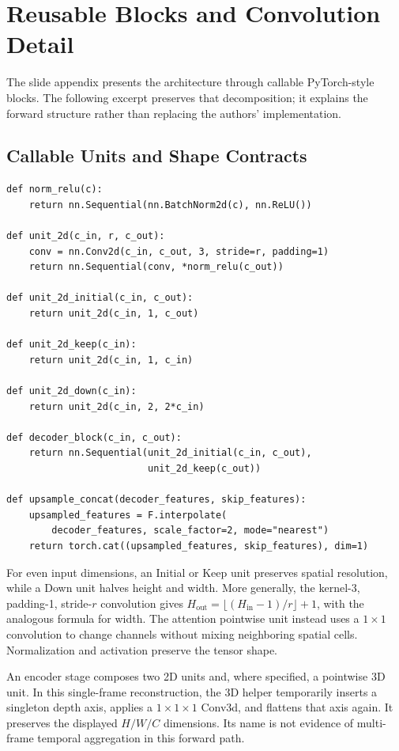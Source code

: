 \section{Reusable Blocks and Convolution Detail}
\label{app:implementation}
The slide appendix presents the architecture through callable PyTorch-style
blocks. The following excerpt preserves that decomposition; it explains the
forward structure rather than replacing the authors' implementation.

\subsection{Callable Units and Shape Contracts}

\begin{lstlisting}
def norm_relu(c):
    return nn.Sequential(nn.BatchNorm2d(c), nn.ReLU())

def unit_2d(c_in, r, c_out):
    conv = nn.Conv2d(c_in, c_out, 3, stride=r, padding=1)
    return nn.Sequential(conv, *norm_relu(c_out))

def unit_2d_initial(c_in, c_out):
    return unit_2d(c_in, 1, c_out)

def unit_2d_keep(c_in):
    return unit_2d(c_in, 1, c_in)

def unit_2d_down(c_in):
    return unit_2d(c_in, 2, 2*c_in)

def decoder_block(c_in, c_out):
    return nn.Sequential(unit_2d_initial(c_in, c_out),
                         unit_2d_keep(c_out))

def upsample_concat(decoder_features, skip_features):
    upsampled_features = F.interpolate(
        decoder_features, scale_factor=2, mode="nearest")
    return torch.cat((upsampled_features, skip_features), dim=1)
\end{lstlisting}

For even input dimensions, an Initial or Keep unit preserves spatial
resolution, while a Down unit halves height and width. More generally, the
kernel-3, padding-1, stride-$r$ convolution gives
$H_{\mathrm{out}}=\lfloor(H_{\mathrm{in}}-1)/r\rfloor+1$, with the analogous
formula for width. The attention pointwise unit instead uses a $1\times1$
convolution to change channels without mixing neighboring spatial cells.
Normalization and activation preserve the tensor shape.

An encoder stage composes two 2D units and, where specified, a pointwise 3D
unit. In this single-frame reconstruction, the 3D helper temporarily inserts
a singleton depth axis, applies a $1\times1\times1$ Conv3d, and flattens that
axis again. It preserves the displayed $H/W/C$ dimensions. Its name is not
evidence of multi-frame temporal aggregation in this forward path.

